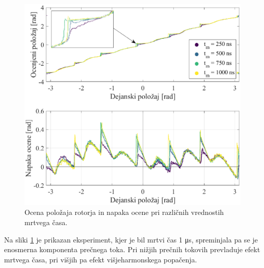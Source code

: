 \documentclass[a4paper,twoside,openright,12pt,slovene]{book}
\begin{document}
\begin{figure}[!htbp]
    \centering
    \includegraphics[width=1.05\columnwidth]{Slike/vsiljenaPozicijaMrtviCasPlot_angleError.eps}
    \caption{\label{vsiljenaPozicijaMrtviCasPlot_angleError} Ocena položaja rotorja in napaka ocene pri različnih vrednostih mrtvega časa. }
\end{figure}

\newpage

Na sliki \ref{vsiljenaPozicijaMrtviCasPlot_angleError} je prikazan eksperiment, kjer je bil mrtvi čas 1 μs, spreminjala pa se je enosmerna komponenta prečnega toka. Pri nižjih prečnih tokovih
prevladuje efekt mrtvega časa, pri višjih pa efekt višjeharmonskega popačenja.
\end{document}
